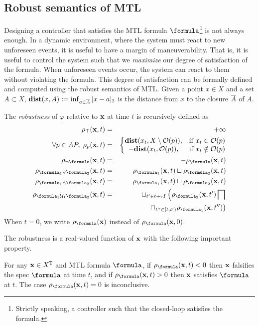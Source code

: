 \subsection{Robust semantics of MTL}
\label{sec:rob sem}
Designing a controller that satisfies the MTL formula $\formula$\footnote{Strictly speaking, a controller such that the closed-loop satisfies the formula.} is not always enough.
In a dynamic environment, where the system must react to new unforeseen events, it is useful to have a margin of maneuverability.
That is, it is useful to control the system such that we \textit{maximize} our degree of satisfaction of the formula.
When unforeseen events occur, the system can react to them without violating the formula.
This degree of satisfaction can be formally defined and computed using the robust semantics of MTL.
Given a point $x \in X$ and a set $A \subset X$, $\mathbf{dist}(x,A) := \inf_{a \in \overline{A}}|x-a|_2$ is the distance from $x$  to the closure $\overline{A}$ of $A$.
\begin{definition}
	\label{def:robustness estimate}
	The \emph{robustness} of $\varphi$ relative to $\mathbf{x}$ at time $t$ is recursively defined as 
	\begin{eqnarray*}
		\label{eq:robustness estimate}
		\rob_{\top} (\sstraj,t) &=& +\infty
		\\
		\forall p \in AP, \;  \rob_{p} (\sstraj,t) &=& \left \lbrace \begin{matrix}
			\dist(\stPt_t, \stSet \setminus \Oc(p)), &\text{if } \stPt_t \in \Oc(p)
			\\
			-\dist(x_t, \Oc(p)), &\text{if } \stPt_t \notin \Oc(p)						
		\end{matrix} \right.
		\\
		\rob_{\lnot \formula} (\sstraj,t) &=& - \rob_{\formula} (\sstraj,t)
		\\
		\rob_{ \formula_1 \lor \formula_2} (\sstraj,t) &=& \rob_{\formula_1} (\sstraj,t) \sqcup \rob_{\formula_2} (\sstraj,t) 
		\\
		\rob_{ \formula_1 \land \formula_2} (\sstraj,t) &=& \rob_{\formula_1} (\sstraj,t) \sqcap \rob_{\formula_2} (\sstraj,t) 
		\\
		\rob_{ \formula_1 \until_I \formula_2} (\sstraj,t) &=& \sqcup_{t' \in t+_{\TDom}I} \left(\rob_{\formula_2} (\sstraj,t') \bigsqcap \right.
		\\
		&& \left. \sqcap_{t'' \in [t,t')}   \rob_{\formula_1} (\sstraj,t'') \right) 
	\end{eqnarray*}
	When $t=0$, we write $\robf(\sstraj)$ instead of $\robf(\sstraj,0)$.
\end{definition}
The robustness is a real-valued function of $\mathbf{x}$ with the following important property.
\begin{theorem} \cite{FainekosP09tcs}
	\label{thm:rob objective}
	For any $\mathbf{x} \in X^{\mathbb{T}}$ and MTL formula $\formula$, 
	if $\robf(\sstraj,t) <0$ then $\mathbf{x}$ falsifies the spec $\formula$ at time $t$, and if $\robf(\sstraj,t) > 0$ then $\mathbf{x}$ satisfies $\formula$ at $t$. 
	The case $\robf(\sstraj,t) =0$ is inconclusive.
\end{theorem} 

